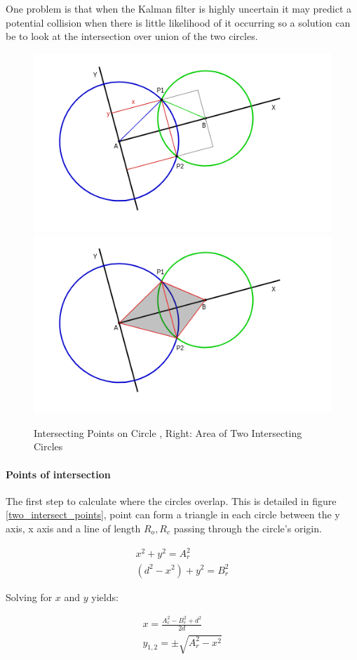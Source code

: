 \documentclass[11pt,twoside]{report}
\begin{document}
One problem is that when the Kalman filter is highly uncertain it may predict a potential collision when there is little likelihood of it occurring so a solution can be to look at the intersection over union of the two circles.

\noindent \begin{figure}[h!]
	\includegraphics[width = 0.5\hsize]{figures/points_intersecting_circles.png}
	\includegraphics[width = 0.5 \hsize]{figures/two_intersecting_circles.png}
	\caption{Intersecting Points on Circle \cite{circle_intersection_point}, Right: Area of Two Intersecting Circles \cite{circle_intersection}}
	\label{two_intersect_points}
	\label{two_intersect_circles}
\end{figure}

\paragraph{Points of intersection}
The first step to calculate where the circles overlap. This is detailed in figure \ref{two_intersect_points}, point can form a triangle in each circle between the y axis, x axis and a line of length $R_{o},R_{c}$ passing through the circle's origin.


\begin{equation}
\begin{aligned}
x^{2} + y^{2} = A_{r}^{2} \\
(d^{2}-x^{2}) + y^{2} = B_{r}^{2}
\end{aligned}
\label{inter_point_eq1}
\end{equation}


Solving for $x$ and $y$ yields:

\begin{equation}
\begin{aligned}
x = \frac{A_{r}^{2} - B_{r}^{2} + d^{2}}{2d} \\
y_{1,2} = \pm \sqrt{A_{r}^{2} - x^{2}}
\end{aligned}
\label{inter_point_eq2}
\end{equation}
\end{document}
